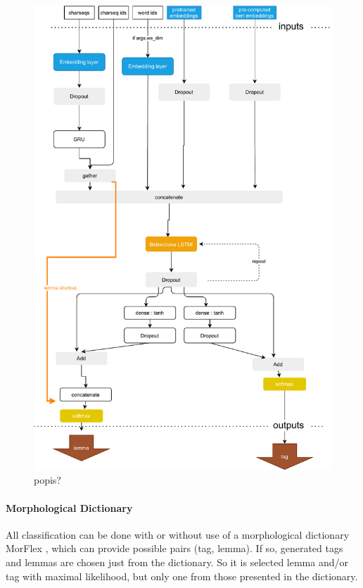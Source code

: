 \begin{figure}[ht]
\centering
\includegraphics[width=1\columnwidth]{../img/taggermodel.pdf}
\protect\caption{popis? }
\label{pic:lt_arch}
\end{figure}

\paragraph{Morphological Dictionary} All classification can be done with or without use of a morphological dictionary MorFlex \citep{11234/1-1834}, which can provide possible pairs (tag, lemma). If so, generated tags and lemmas are chosen just from the dictionary. So it is selected lemma and/or tag with maximal likelihood, but only one from those presented in the dictionary. 

